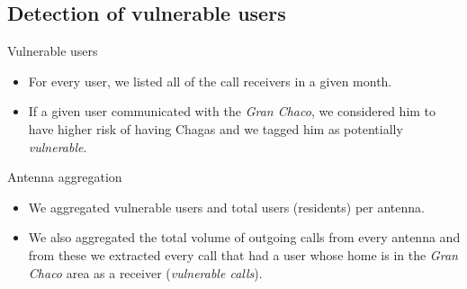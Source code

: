 \subsection{Detection of vulnerable users}
	\begin{block}{Vulnerable users}
		\begin{itemize}
			\item For every user, we listed all of the call receivers in a given month.
			
			\item If a given user communicated with the \textit{Gran Chaco}, we considered him to have higher risk
			of having Chagas and we tagged him as potentially \textit{vulnerable}.
		\end{itemize}
	\end{block}
	
		\begin{block}{Antenna aggregation}
		\begin{itemize}
			\item  We aggregated vulnerable users and total users (residents) per antenna.
			
			\item We also aggregated the total volume of outgoing calls from every antenna and from these we extracted
			every call that had a user whose home is in the \textit{Gran Chaco} area as a receiver (\textit{vulnerable calls}).
			
		\end{itemize}
		
	\end{block}
